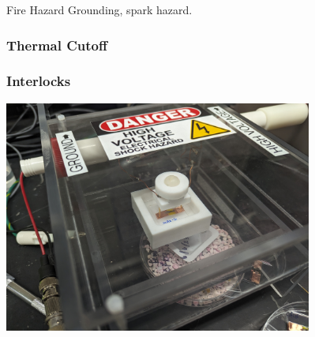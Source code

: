 \documentclass{presentation}
\begin{document}
\begin{frame}{Fire Hazard}
  Grounding, spark hazard.
\end{frame}

\begin{frame}\frametitle{Thermal Cutoff}
  \centering
\end{frame}

\begin{frame}\frametitle{Interlocks}
  \centering
  \includegraphics[height=3in]{"./hv.jpg"}
\end{frame}
\end{document}

